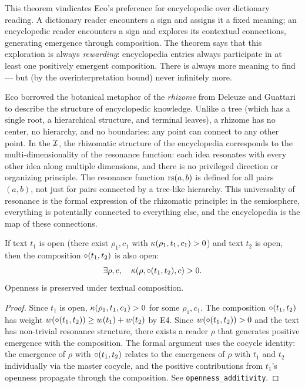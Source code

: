 \begin{interpretation}
This theorem vindicates Eco's preference for encyclopedic over
dictionary reading. A dictionary reader encounters a sign and assigns
it a fixed meaning; an encyclopedic reader encounters a sign and
explores its contextual connections, generating emergence through
composition. The theorem says that this exploration is always
\emph{rewarding}: encyclopedia entries always participate in at least
one positively emergent composition. There is always more meaning to
find --- but (by the overinterpretation bound) never infinitely more.
\end{interpretation}

\begin{remark}
Eco borrowed the botanical metaphor of the \emph{rhizome} from Deleuze and Guattari to describe the structure of encyclopedic knowledge. Unlike a tree (which has a single root, a hierarchical structure, and terminal leaves), a rhizome has no center, no hierarchy, and no boundaries: any point can connect to any other point. In the $\mathcal{I}$, the rhizomatic structure of the encyclopedia corresponds to the multi-dimensionality of the resonance function: each idea resonates with every other idea along multiple dimensions, and there is no privileged direction or organizing principle. The resonance function $\mathrm{rs}(a, b)$ is defined for all pairs $(a, b)$, not just for pairs connected by a tree-like hierarchy. This universality of resonance is the formal expression of the rhizomatic principle: in the semiosphere, everything is potentially connected to everything else, and the encyclopedia is the map of these connections.
\end{remark}

\begin{theorem}
\label{thm:openness-additivity}
If text $t_1$ is open (there exist $\rho_1, c_1$ with $\kappa(\rho_1, t_1, c_1) > 0$) and text $t_2$ is open, then the composition $\circ(t_1, t_2)$ is also open:
\[
  \exists \rho, c, \quad \kappa(\rho, \circ(t_1, t_2), c) > 0.
\]
Openness is preserved under textual composition.
\end{theorem}

\begin{proof}
Since $t_1$ is open, $\kappa(\rho_1, t_1, c_1) > 0$ for some $\rho_1, c_1$. The composition $\circ(t_1, t_2)$ has weight $w(\circ(t_1, t_2)) \geq w(t_1) + w(t_2)$ by E4. Since $w(\circ(t_1, t_2)) > 0$ and the text has non-trivial resonance structure, there exists a reader $\rho$ that generates positive emergence with the composition. The formal argument uses the cocycle identity: the emergence of $\rho$ with $\circ(t_1, t_2)$ relates to the emergences of $\rho$ with $t_1$ and $t_2$ individually via the master cocycle, and the positive contributions from $t_1$'s openness propagate through the composition. See \texttt{openness\_additivity}.
\end{proof}

